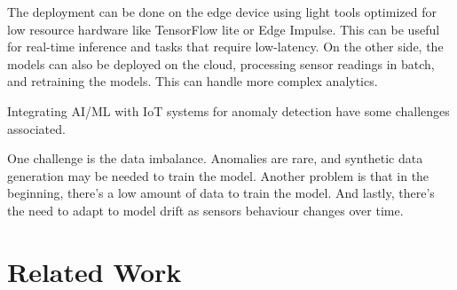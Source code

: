 The deployment can be done on the edge device using light tools optimized for
low resource hardware like TensorFlow lite or Edge Impulse. This can be useful
for real-time inference and tasks that require low-latency.
On the other side, the models can also be deployed on the cloud, processing
sensor readings in batch, and retraining the models. This can handle more
complex analytics.

Integrating \gls{AI}/\gls{ML} with \gls{IoT} systems for anomaly detection
have some challenges associated.

One challenge is the data imbalance.
Anomalies are rare, and synthetic data generation may be needed to train
the model.
Another problem is that in the beginning, there's a low amount of data to
train the model.
And lastly, there's the need to adapt to model drift as sensors behaviour
changes over time.

\section{Related Work}



